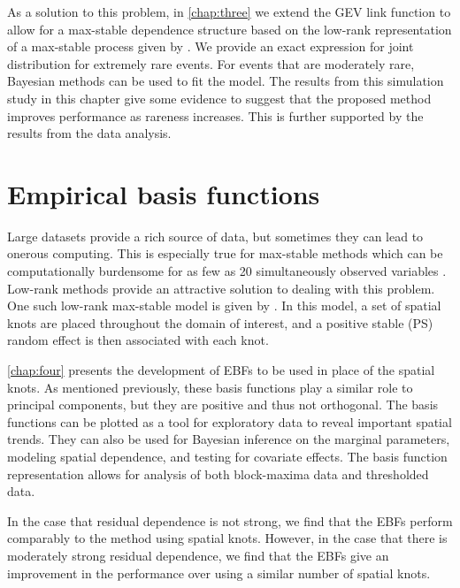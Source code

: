 As a solution to this problem, in \cref{chap:three} we extend the GEV link \citep{Wang2010} function to allow for a max-stable dependence structure based on the low-rank representation of a max-stable process given by \citet{Reich2012}.
We provide an exact expression for joint distribution for extremely rare events.
For events that are moderately rare, Bayesian methods can be used to fit the model.
The results from this simulation study in this chapter give some evidence to suggest that the proposed method improves performance as rareness increases.
This is further supported by the results from the data analysis.

\section{Empirical basis functions}

Large datasets provide a rich source of data, but sometimes they can lead to onerous computing.
This is especially true for max-stable methods which can be computationally burdensome for as few as 20 simultaneously observed variables \citep{Wadsworth2014}.
Low-rank methods provide an attractive solution to dealing with this problem.
One such low-rank max-stable model is given by \citet{Reich2012}.
In this model, a set of spatial knots are placed throughout the domain of interest, and a positive stable (PS) random effect is then associated with each knot.

\cref{chap:four} presents the development of EBFs to be used in place of the spatial knots.
As mentioned previously, these basis functions play a similar role to principal components, but they are positive and thus not orthogonal.
The basis functions can be plotted as a tool for exploratory data to reveal important spatial trends.
They can also be used for Bayesian inference on the marginal parameters, modeling spatial dependence, and testing for covariate effects.
The basis function representation allows for analysis of both block-maxima data and thresholded data.

In the case that residual dependence is not strong, we find that the EBFs perform comparably to the method using spatial knots.
However, in the case that there is moderately strong residual dependence, we find that the EBFs give an improvement in the performance over using a similar number of spatial knots.
